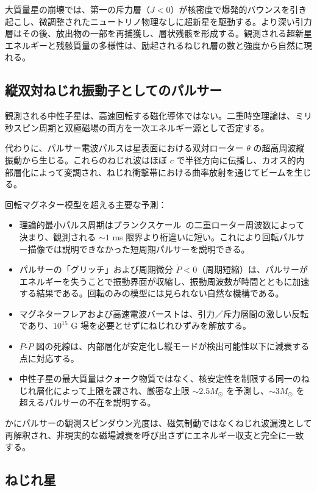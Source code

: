 \documentclass[a4paper]{article}
\begin{document}
大質量星の崩壊では、第一の斥力層（$J < 0$）が核密度で爆発的バウンスを引き起こし、微調整されたニュートリノ物理なしに超新星を駆動する。より深い引力層はその後、放出物の一部を再捕獲し、層状残骸を形成する。観測される超新星エネルギーと残骸質量の多様性は、励起されるねじれ層の数と強度から自然に現れる。

\subsection{縦双対ねじれ振動子としてのパルサー}

観測される中性子星は、高速回転する磁化導体ではない。二重時空理論は、ミリ秒スピン周期と双極磁場の両方を一次エネルギー源として否定する。

代わりに、パルサー電波パルスは星表面における双対ローター $\theta$ の超高周波縦振動から生じる。これらのねじれ波はほぼ $c$ で半径方向に伝播し、カオス的内部層化によって変調され、ねじれ衝撃帯における曲率放射を通じてビームを生じる。

回転マグネター模型を超える主要な予測：
\begin{itemize}
\item 理論的最小パルス周期はプランクスケール~\cite{planck1900}の二重ローター周波数によって決まり、観測される $\sim 1$ ms 限界より桁違いに短い。これにより回転パルサー描像では説明できなかった短周期パルサーを説明できる。
\item パルサーの「グリッチ」および周期微分 $\dot{P} < 0$（周期短縮）は、パルサーがエネルギーを失うことで振動界面が収縮し、振動周波数が時間とともに加速する結果である。回転のみの模型には見られない自然な機構である。
\item マグネターフレアおよび高速電波バーストは、引力／斥力層間の激しい反転であり、$10^{15}$ G 場を必要とせずにねじれひずみを解放する。
\item $P$-$\dot{P}$ 図の死線は、内部層化が安定化し縦モードが検出可能性以下に減衰する点に対応する。
\item 中性子星の最大質量はクォーク物質ではなく、核安定性を制限する同一のねじれ層化によって上限を課され、厳密な上限 $\sim 2.5 M_\odot$ を予測し、$\sim 3 M_\odot$ を超えるパルサーの不在を説明する。
\end{itemize}

かにパルサーの観測スピンダウン光度は、磁気制動ではなくねじれ波漏洩として再解釈され、非現実的な磁場減衰を呼び出さずにエネルギー収支と完全に一致する。

\subsection{ねじれ星}
\end{document}
